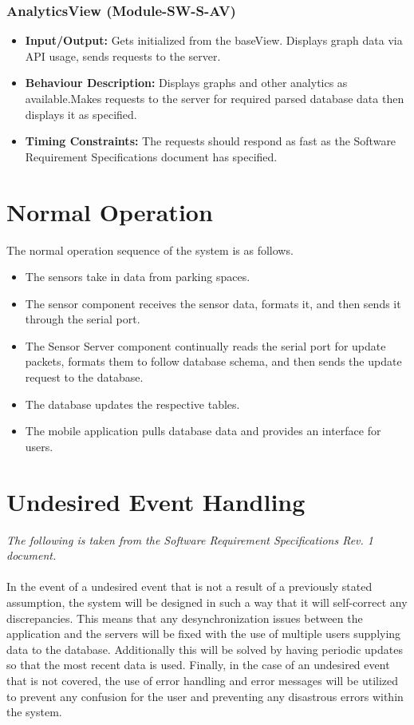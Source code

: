 \documentclass[]{article}
\begin{document}
	\subsubsection{AnalyticsView (Module-SW-S-AV)}
	\begin{itemize}
		\item \textbf{Input/Output:} Gets initialized from the baseView. Displays graph data via API usage, sends requests to the server.
		\item \textbf{Behaviour Description:} Displays graphs and other analytics as available.Makes requests to the server for required parsed database data then displays it as specified.
		\item \textbf{Timing Constraints:} The requests should respond as fast as the Software Requirement Specifications document has specified.
	\end{itemize}
	
	\section{Normal Operation}
	The normal operation sequence of the system is as follows.
	\begin{itemize}
		\item The sensors take in data from parking spaces.
		\item The sensor component receives the sensor data, formats it, and then sends it through the serial port.
		\item The Sensor Server component continually reads the serial port for update packets, formats them to follow database schema, and then sends the update request to the database.
		\item The database updates the respective tables.
		\item The mobile application pulls database data and provides an interface for users.
	\end{itemize}
	
	\section{Undesired Event Handling}
	\textit{The following is taken from the Software Requirement Specifications Rev. 1 document.}\\\\
	In the event of a undesired event that is not a result of a previously stated assumption, the system will be designed in such a way that it will self-correct any discrepancies. This means that any desynchronization issues between the application and the servers will be fixed with the use of multiple users supplying data to the database. Additionally this will be solved by having periodic updates so that the most recent data is used. Finally, in the case of an undesired event that is not covered, the use of error handling and error messages will be utilized to prevent any confusion for the user and preventing any disastrous errors within the system.
\end{document}
